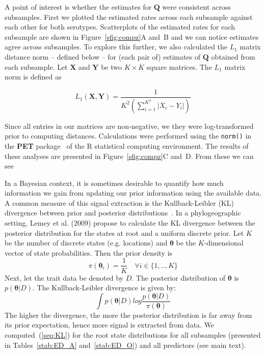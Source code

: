 \documentclass[a4paper,10pt]{article}
\begin{document}

A point of interest is whether the estimates for $\mathbf{Q}$ were consistent across subsamples.
First we plotted the estimated rates across each subsample against each other for both serotypes.
Scatterplots of the estimated rates for each subsample are shown in Figure~\ref{sfig:compz}A and~B and we can notice estimates agree across subsamples.
To explore this further, we also calculated the $L_1$ matrix distance norm -- defined below -- for (each pair of) estimates of $\mathbf{Q}$ obtained from each subsample.
Let $\mathbf{X}$ and $\mathbf{Y}$ be two $K \times K$ square matrices.
The $L_1$ matrix norm is defined as

\begin{equation}
\label{seq:L1}
 L_1 (\mathbf{X}, \mathbf{Y}) = \frac{1}{K^{2} (\sum_{i=1}^{K^2} |X_i-Y_i| ) }
\end{equation}

Since all entries in our matrices are non-negative, we they were log-transformed prior to computing distances.
Calculations were performed using the \verb|norm()| in the \textbf{PET} package~\cite{PET} of the R statistical computing environment.
The results of these analyses are presented in Figure~\ref{sfig:compz}C and~D.
From these we can see 

In a Bayesian context, it is sometimes desirable to quantify how much information we gain from updating our prior information using the available data.
A common measure of this signal extraction is the Kullback-Leibler (KL) divergence between prior and posterior distributions~\cite{M-KL}.
In a phylogeographic setting, Lemey et al. (2009) \cite{M-roots} propose to calculate the KL divergence between the posterior distribution for the states at root and a uniform discrete prior.
Let $K$ be the number of discrete states (e.g. locations) and $\boldsymbol\theta$ be the $K$-dimensional vector of state probabilities.
Then the prior density is
\begin{equation}
\label{seq:prior}
\pi(\boldsymbol\theta_i) = \frac{1}{K} \quad \forall i \in \{1,..,K\} 
\end{equation}
Next, let the trait data be denoted by $D$.
The posterior distribution of $\boldsymbol\theta$ is $p(\boldsymbol\theta|D)$.
The Kullback-Leibler divergence is given by:
\begin{equation}
\label{seq:KL}
\int p(\boldsymbol\theta|D)log\frac{p(\boldsymbol\theta|D)}{\pi(\boldsymbol\theta)}
\end{equation}
The higher the divergence, the more the posterior distribution is far away from its prior expectation, hence more signal is extracted from data.
We computed~(\ref{seq:KL}) for the root state distributions for all subsamples (presented in Tables~\ref{stab:ED_A} and~\ref{stab:ED_O}) and all predictors (see main text).
\end{document}
